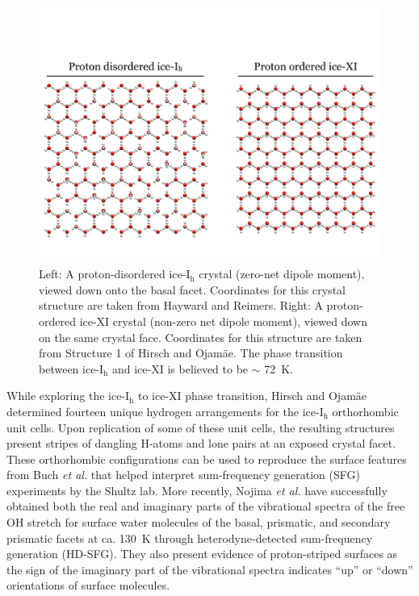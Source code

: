 \begin{figure} 
\includegraphics[width=\linewidth]{Figures/iceTransition}
\caption{\label{fig:iceTransition}Left: A proton-disordered
  ice-I$_\mathrm{h}$ crystal (zero-net dipole moment), viewed down
  onto the basal facet. Coordinates for this crystal structure are
  taken from Hayward and Reimers.\cite{Hayward1997} Right: A
  proton-ordered ice-XI crystal (non-zero net dipole moment), viewed
  down on the same crystal face. Coordinates for this structure are
  taken from Structure 1 of Hirsch and Ojam\"{a}e.\cite{Hirsch2004}
  The phase transition between ice-I$_\mathrm{h}$ and ice-XI is
  believed to be $\sim$ 72~K.}
\end{figure}

While exploring the ice-I$_\mathrm{h}$ to ice-XI phase transition, Hirsch
and Ojam\"{a}e determined fourteen unique hydrogen arrangements for the
ice-I$_\mathrm{h}$ orthorhombic unit cells.\cite{Hirsch2004} Upon
replication of some of these unit cells, the resulting structures
present stripes of dangling H-atoms and lone pairs at an exposed
crystal facet. These orthorhombic configurations can be used
to reproduce the surface features from Buch \textit{et
  al.}\cite{Buch2008} that helped interpret sum-frequency generation
(SFG) experiments by the Shultz lab.\cite{Groenzin2007} More recently,
Nojima \textit{et al.}\cite{Nojima2017} have successfully obtained
both the real and imaginary parts of the vibrational spectra of the
free OH stretch for surface water molecules of the basal, prismatic,
and secondary prismatic facets at ca. 130~K through
heterodyne-detected sum-frequency generation (HD-SFG). They also
present evidence of proton-striped surfaces as the sign of the
imaginary part of the vibrational spectra indicates ``up'' or ``down''
orientations of surface molecules.

